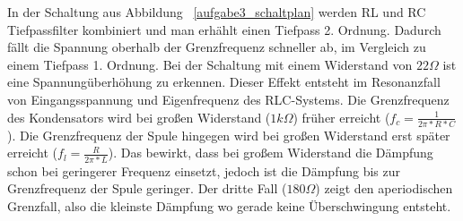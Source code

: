 \documentclass[12pt,a4paper,titlepage]{article}
\begin{document}
\noindent In der Schaltung aus Abbildung ~\ref{aufgabe3_schaltplan} werden RL und RC Tiefpassfilter kombiniert und man erh\"ahlt einen Tiefpass 2. Ordnung. Dadurch f\"allt die Spannung oberhalb der Grenzfrequenz schneller ab, im Vergleich zu einem Tiefpass 1. Ordnung. Bei der Schaltung mit einem Widerstand von $22 \Omega$ ist eine Spannung\"uberh\"ohung zu erkennen. Dieser Effekt entsteht im Resonanzfall von Eingangsspannung und Eigenfrequenz des RLC-Systems. Die Grenzfrequenz des Kondensators wird bei gro\ss en Widerstand ($ 1k\Omega$) fr\"uher erreicht ($f_c = \frac{1}{2\pi*R*C}$). Die Grenzfrequenz der Spule hingegen wird bei gro\ss en Widerstand erst sp\"ater erreicht ($f_l = \frac{R}{2\pi*L}$). Das bewirkt, dass bei gro\ss em Widerstand die D\"ampfung schon bei geringerer Frequenz einsetzt, jedoch ist die D\"ampfung bis zur Grenzfrequenz der Spule geringer. Der dritte Fall ($180 \Omega$) zeigt den aperiodischen Grenzfall, also die kleinste D\"ampfung wo gerade keine \"Uberschwingung entsteht.
\end{document}
